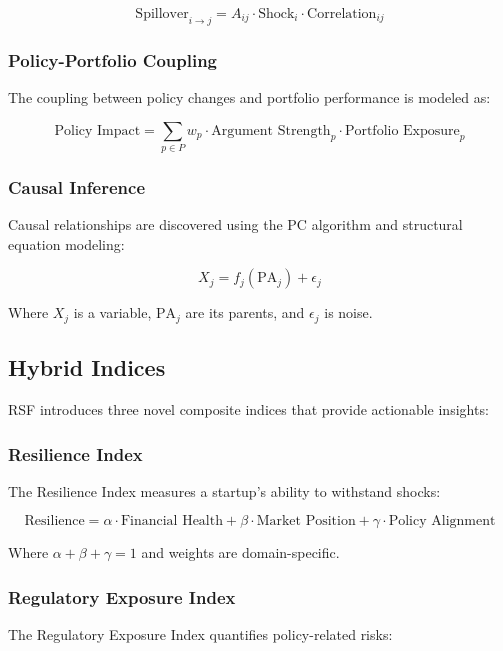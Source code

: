 \begin{equation}
\text{Spillover}_{i \rightarrow j} = A_{ij} \cdot \text{Shock}_i \cdot \text{Correlation}_{ij}
\end{equation}

\subsubsection{Policy-Portfolio Coupling}
The coupling between policy changes and portfolio performance is modeled as:

\begin{equation}
\text{Policy Impact} = \sum_{p \in P} w_p \cdot \text{Argument Strength}_p \cdot \text{Portfolio Exposure}_p
\end{equation}

\subsubsection{Causal Inference}
Causal relationships are discovered using the PC algorithm and structural equation modeling:

\begin{equation}
X_j = f_j(\text{PA}_j) + \epsilon_j
\end{equation}

Where $X_j$ is a variable, $\text{PA}_j$ are its parents, and $\epsilon_j$ is noise.

\subsection{Hybrid Indices}

RSF introduces three novel composite indices that provide actionable insights:

\subsubsection{Resilience Index}
The Resilience Index measures a startup's ability to withstand shocks:

\begin{equation}
\text{Resilience} = \alpha \cdot \text{Financial Health} + \beta \cdot \text{Market Position} + \gamma \cdot \text{Policy Alignment}
\end{equation}

Where $\alpha + \beta + \gamma = 1$ and weights are domain-specific.

\subsubsection{Regulatory Exposure Index}
The Regulatory Exposure Index quantifies policy-related risks:

